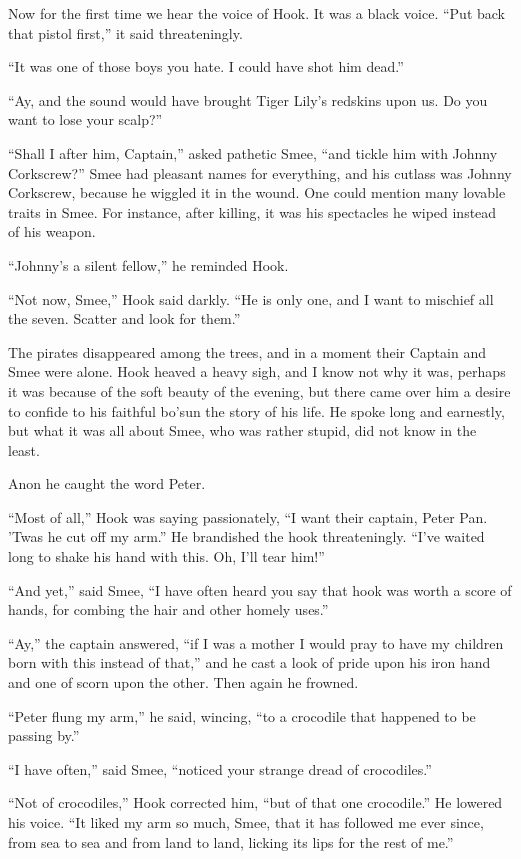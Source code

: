 Now for the first time we hear the voice of Hook.
It was a black voice.
“Put back that pistol first,” it said threateningly.

“It was one of those boys you hate.
I could have shot him dead.”

“Ay, and the sound would have brought Tiger Lily’s redskins upon us.
Do you want to lose your scalp?”

“Shall I after him, Captain,” asked pathetic Smee, “and tickle him with Johnny Corkscrew?”
Smee had pleasant names for everything,
and his cutlass was Johnny Corkscrew, because he wiggled it in the wound.
One could mention many lovable traits in Smee.
For instance, after killing, it was his spectacles he wiped instead of his weapon.

“Johnny’s a silent fellow,” he reminded Hook.

“Not now, Smee,” Hook said darkly.
“He is only one, and I want to mischief all the seven.
Scatter and look for them.”

The pirates disappeared among the trees,
and in a moment their Captain and Smee were alone.
Hook heaved a heavy sigh, and I know not why it was,
perhaps it was because of the soft beauty of the evening,
but there came over him a desire to confide to his faithful bo’sun the story of his life.
He spoke long and earnestly, but what it was all about Smee, who was rather stupid, did not know in the least.

Anon he caught the word Peter.

“Most of all,” Hook was saying passionately, “I want their captain, Peter Pan.
’Twas he cut off my arm.”
He brandished the hook threateningly.
“I’ve waited long to shake his hand with this.
Oh, I’ll tear him!”

“And yet,” said Smee,
“I have often heard you say that hook was worth a score of hands,
for combing the hair and other homely uses.”

“Ay,” the captain answered,
“if I was a mother I would pray to have my children born with this instead of that,”
and he cast a look of pride upon his iron hand and one of scorn upon the other.
Then again he frowned.

“Peter flung my arm,” he said, wincing, “to a crocodile that happened to be passing by.”

“I have often,” said Smee, “noticed your strange dread of crocodiles.”

“Not of crocodiles,” Hook corrected him, “but of that one crocodile.”
He lowered his voice.
“It liked my arm so much, Smee, that it has followed me ever since,
from sea to sea and from land to land, licking its lips for the rest of me.”

